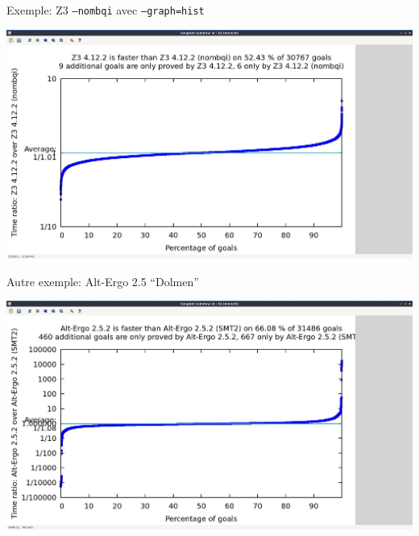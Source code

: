 \documentclass{beamer}
\begin{document}
\begin{frame}{Exemple: Z3 \texttt{--nombqi} avec \texttt{--graph=hist}}

  \begin{center}
    \includegraphics[width=\textwidth]{z3_nombqi.jpg}
  \end{center}

\end{frame}

\begin{frame}{Autre exemple: Alt-Ergo 2.5 ``Dolmen''}

  \begin{center}
    \includegraphics[width=\textwidth]{alt_ergo_smt.jpg}
  \end{center}

\end{frame}
\end{document}
